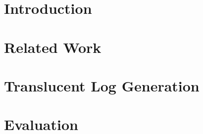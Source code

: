\documentclass[a4paper,11pt,twoside]{pads-thesis}
\begin{document}

\gTitlePage

% 

\tableofcontents

\cleardoublepage
\pagestyle{fancy}

\chapter{Introduction} \label{chap:intro}


% 

\chapter{Related Work} \label{chap:related_work}


\chapter{Translucent Log Generation} \label{chap:method}


% 

\chapter{Evaluation} \label{chap:eval}


% 
\end{document}
